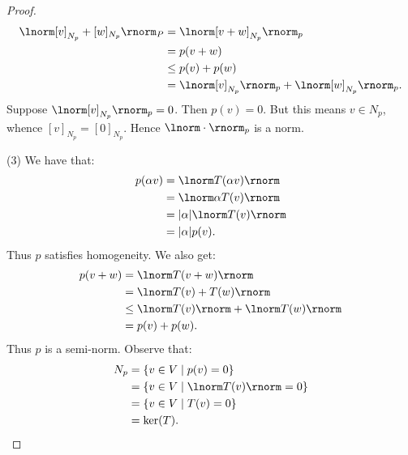 \documentclass[11pt,twoside,openany]{memoir}
\begin{document}
\begin{proof}
\begin{equation*}
                \begin{split}
                    \lnorm [v]_{N_p} + [w]_{N_p} \rnorm_P
                    & = \lnorm [v + w]_{N_p} \rnorm _p\\
                    & = p(v+w) \\
                    & \leq p(v) + p(w) \\
                    & = \lnorm [v]_{N_p} \rnorm_p +\lnorm [w]_{N_p} \rnorm_p.
                \end{split}
                \end{equation*}
            Suppose $\lnorm [v]_{N_p} \rnorm_p = 0$. Then $p(v) = 0$. But this means $v \in N_p$, whence $[v]_{N_p} = [0]_{N_p}$. Hence $\lnorm \cdot \rnorm_p$ is a norm.

            (3) We have that:
                \begin{equation*}
                \begin{split}
                    p(\alpha v)
                    & = \lnorm T(\alpha v) \rnorm \\
                    & = \lnorm \alpha T(v) \rnorm \\
                    & = |\alpha| \lnorm T(v) \rnorm \\
                    & = |\alpha| p(v).
                \end{split}
                \end{equation*}
            Thus $p$ satisfies homogeneity. We also get:
                \begin{equation*}
                \begin{split}
                    p(v+w)
                    & = \lnorm T(v+w) \rnorm \\
                    & = \lnorm T(v) + T(w) \rnorm \\
                    & \leq \lnorm T(v) \rnorm + \lnorm T(w) \rnorm \\
                    & = p(v) + p(w).
                \end{split}
                \end{equation*}
            Thus $p$ is a semi-norm. Observe that:
                \begin{equation*}
                \begin{split}
                    N_p 
                    & = \{v \in V \mid p(v) = 0\} \\
                    & = \{v \in V \mid \lnorm T(v) \rnorm = 0\} \\
                    & = \{v \in V \mid T(v) = 0\} \\
                    & = \ker(T).
                \end{split}
                \end{equation*}
        \end{proof}
\end{document}
